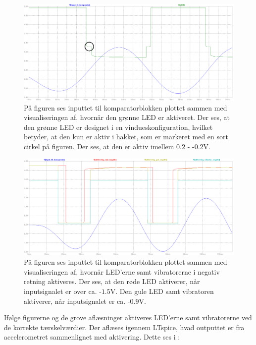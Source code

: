 \begin{figure}[H]
	\centering
	\includegraphics[scale=.38]{figures/cProblemloesning/Samlet_system_sim5.PNG}
	\caption{På figuren ses inputtet til komparatorblokken plottet sammen med visualiseringen af, hvornår den grønne LED er aktiveret. Der ses, at den grønne LED er designet i en vindueskonfiguration, hvilket betyder, at den kun er aktiv i hakket, som er markeret med en sort cirkel på figuren. Der ses, at den er aktiv imellem $0.2$ - -$0.2$V.}
	\label{fig:samlet_system_sim5}
\end{figure}
\begin{figure}[H]
	\centering
	\includegraphics[scale=.38]{figures/cProblemloesning/Samlet_system_sim4.PNG}
	\caption{På figuren ses inputtet til komparatorblokken plottet sammen med visualiseringen af, hvornår LED'erne samt vibratorerne i negativ retning aktiveres. Der ses, at den røde LED aktiverer, når inputsignalet er over ca. -$1.5$V. Den gule LED samt vibratoren aktiverer, når inputsignalet er ca. -$0.9$V.}
	\label{fig:samlet_system_sim3}
\end{figure}
\noindent Ifølge figurerne og de grove aflæsninger aktiveres LED'erne samt vibratorerne ved de korrekte tærskelværdier. Der aflæses igennem LTspice, hvad outputtet er fra accelerometret sammenlignet med aktivering. Dette ses i :
